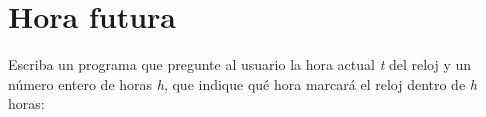 \section{Hora futura}

Escriba un programa que pregunte al usuario la hora actual \emph{t} del
reloj y un número entero de horas \emph{h}, que indique qué hora marcará
el reloj dentro de \emph{h} horas:
